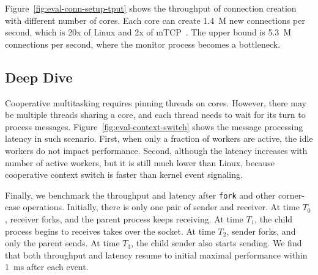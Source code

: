 Figure~\ref{fig:eval-conn-setup-tput} shows the throughput of connection creation with different number of cores. Each core can create 1.4~M new connections per second, which is 20x of Linux and 2x of mTCP~\cite{jeong2014mtcp}. The upper bound is 5.3~M connections per second, where the monitor process becomes a bottleneck.




\subsection{Deep Dive}

Cooperative multitasking requires pinning threads on cores. However, there may be multiple threads sharing a core, and each thread needs to wait for its turn to process messages.
Figure~\ref{fig:eval-context-switch} shows the message processing latency in such scenario.
First, when only a fraction of workers are active, the idle workers do not impact performance. 
Second, although the latency increases with number of active workers, but it is still much lower than Linux, because cooperative context switch is faster than kernel event signaling.


Finally, we benchmark the throughput and latency after \texttt{fork} and other corner-case operations. Initially, there is only one pair of sender and receiver. At time $T_0$, receiver forks, and the parent process keeps receiving. At time $T_1$, the child process begins to receives takes over the socket. At time $T_2$, sender forks, and only the parent sends. At time $T_3$, the child sender also starts sending. We find that both throughput and latency resume to initial maximal performance within 1~ms after each event.